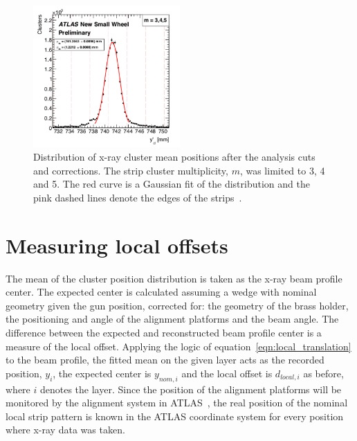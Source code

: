 \begin{figure}
    \centering
    \includegraphics[width = 0.5\textwidth]{figures/figure_xray_beam_profile.pdf}
    \caption{Distribution of x-ray cluster mean positions after the analysis cuts and corrections. The strip cluster multiplicity, $m$, was limited to 3, 4 and 5. The red curve is a Gaussian fit of the distribution and the pink dashed lines denote the edges of the strips~\cite{lefebvre_precision_2020}.}
    \label{fig:xray_beam_profile}
\end{figure}

\section{Measuring local offsets}
The mean of the cluster position distribution is taken as the x-ray beam profile center. The expected center is calculated assuming a wedge with nominal geometry given the gun position, corrected for: the geometry of the brass holder, the positioning and angle of the alignment platforms and the beam angle. The difference between the expected and reconstructed beam profile center is a measure of the local offset. Applying the logic of equation~\ref{eqn:local_translation} to the beam profile, the fitted mean on the given layer acts as the recorded position, $y_i$, the expected center is $y_{nom, i}$ and the local offset is $d_{local, i}$ as before, where $i$ denotes the layer. Since the position of the alignment platforms will be monitored by the alignment system in ATLAS~\cite{nsw_tdr}, the real position of the nominal local strip pattern is known in the ATLAS coordinate system for every position where x-ray data was taken.

